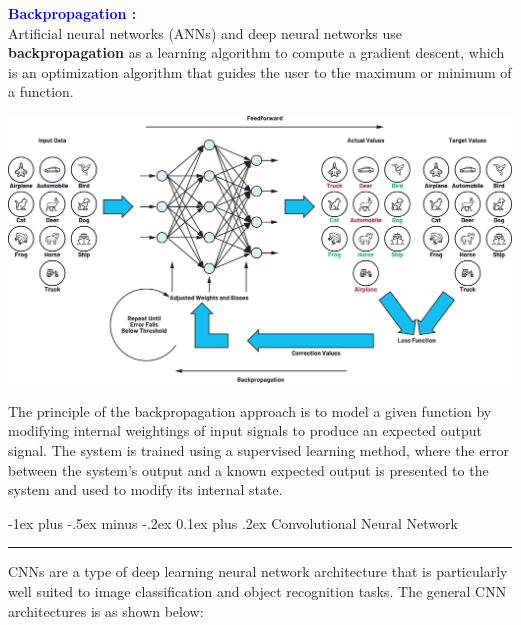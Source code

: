 \documentclass[letterpaper, 10.5pt,landscape]{article}
\makeatletter
\renewcommand{\section}{\@startsection{section}{1}{0mm}%
                                {-1ex plus -.5ex minus -.2ex}%
                                {0.1ex plus .2ex}%
                                {\normalfont\small}}
\makeatother
\begin{document}
\begin{multicols*}{3}
\vspace{3pt}

\textbf{\textcolor{blue}{Backpropagation :}}  \\
Artificial neural networks (ANNs) and deep neural networks use \textbf{backpropagation} as a learning algorithm to compute a gradient descent, which is an optimization algorithm that guides the user to the maximum or minimum of a function. 

\vspace{-5pt}

\begin{center}
    \begin{minipage}{\linewidth}
    \includegraphics[width=\textwidth]{figures/feedforward_backpropagation.png}
    \end{minipage}
\end{center}

\vspace{-5pt}



The principle of the backpropagation approach is to model a given function by modifying internal weightings of input signals to produce an expected output signal. The system is trained using a supervised learning method, where the error between the system’s output and a known expected output is presented to the system and used to modify its internal state.


\section{Convolutional Neural Network} {\color{teal}\hrule height 1pt} \smallskip
CNNs are a type of deep learning neural network architecture that is particularly well suited to image classification and object recognition tasks. The general CNN architectures is as shown below:
\vspace{-5pt}


\end{multicols*}
\end{document}
